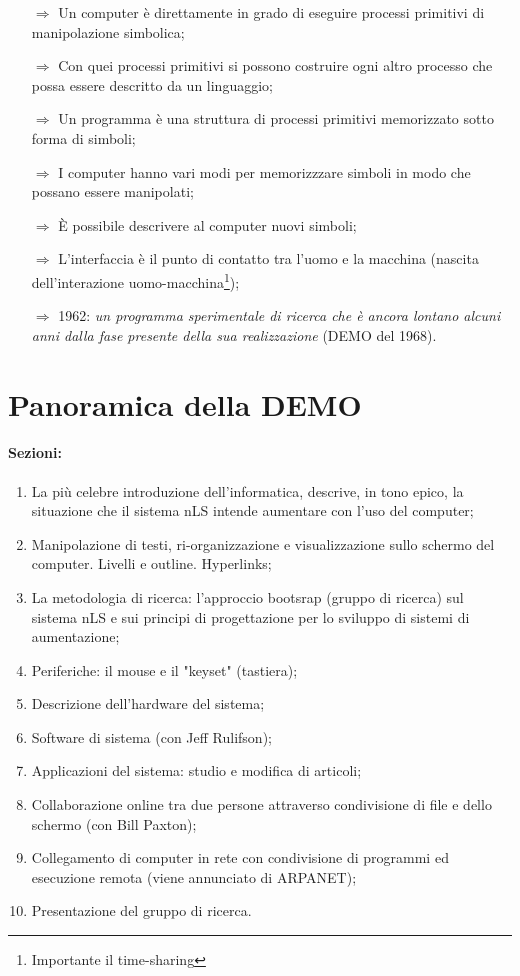 \begin{itemize}
    \item [$\Rightarrow$] Un computer è direttamente in grado di eseguire processi primitivi di manipolazione simbolica;
    \item [$\Rightarrow$] Con quei processi primitivi si possono costruire ogni altro processo che possa essere descritto da un linguaggio;
    \item [$\Rightarrow$] Un programma è una struttura di processi primitivi memorizzato sotto forma di simboli;
    \item [$\Rightarrow$] I computer hanno vari modi per memorizzzare simboli in modo che possano essere manipolati;
    \item [$\Rightarrow$] È possibile descrivere al computer nuovi simboli;
    \item [$\Rightarrow$] L'interfaccia è il punto di contatto tra l'uomo e la macchina (nascita dell'interazione uomo-macchina\footnote{Importante il time-sharing});
    \item [$\Rightarrow$] 1962: \textit{un programma sperimentale di ricerca che è ancora lontano alcuni anni dalla fase presente della sua realizzazione} (DEMO del 1968).
\end{itemize}

\section{Panoramica della DEMO}

\paragraph{Sezioni:}

\begin{enumerate}
    \item La più celebre introduzione dell'informatica, descrive, in tono epico,
    la situazione che il sistema nLS intende aumentare con l'uso del computer;
    \item Manipolazione di testi, ri-organizzazione e visualizzazione sullo schermo del 
    computer. Livelli e outline. Hyperlinks;
    \item La metodologia di ricerca: l'approccio bootsrap (gruppo di ricerca) sul sistema nLS
    e sui principi di progettazione per lo sviluppo di sistemi di aumentazione;
    \item Periferiche: il mouse e il "keyset" (tastiera);
    \item Descrizione dell'hardware del sistema;
    \item Software di sistema (con Jeff Rulifson);
    \item Applicazioni del sistema: studio e modifica di articoli;
    \item Collaborazione online tra due persone attraverso condivisione di file e dello schermo (con Bill Paxton);
    \item Collegamento di computer in rete con condivisione di programmi ed esecuzione remota (viene annunciato di ARPANET);
    \item Presentazione del gruppo di ricerca.
\end{enumerate}

